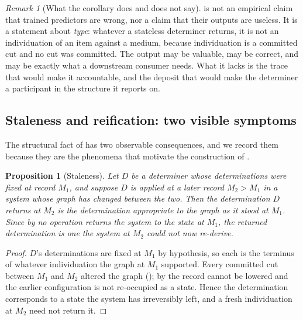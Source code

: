 \documentclass[11pt,twocolumn,a4paper]{article}
\theoremstyle{dirthm}
\newtheorem{proposition}[theorem]{Proposition}
\theoremstyle{definition}
\theoremstyle{remark}
\newtheorem{remark}[theorem]{Remark}
\newcommand{\rec}{M}
\begin{document}
\begin{remark}[What the corollary does and does not say]
\label{rem:corollary-honest}
 is not an empirical claim that trained
predictors are wrong, nor a claim that their outputs are useless. It is a
statement about \emph{type}: whatever a stateless determiner returns, it is
not an individuation of an item against a medium, because individuation is a
committed cut and no cut was committed. The output may be valuable, may be
correct, and may be exactly what a downstream consumer needs. What it lacks
is the trace that would make it accountable, and the deposit that would make
the determiner a participant in the structure it reports on.
\end{remark}

\subsection{Staleness and reification: two visible symptoms}
\label{sec:reification}

The structural fact of  has two observable
consequences, and we record them because they are the phenomena that
motivate the construction of .

\begin{proposition}[Staleness]
\label{prop:staleness}
Let $D$ be a determiner whose determinations were fixed at record $\rec_1$,
and suppose $D$ is applied at a later record $\rec_2>\rec_1$ in a system whose
graph has changed between the two. Then the determination $D$ returns at
$\rec_2$ is the determination appropriate to the graph as it stood at
$\rec_1$. Since by  no operation returns the system to the
state at $\rec_1$, the returned determination is one the system at $\rec_2$
could not now re-derive.
\end{proposition}

\begin{proof}
$D$'s determinations are fixed at $\rec_1$ by hypothesis, so each is the
terminus of whatever individuation the graph at $\rec_1$ supported. Every
committed cut between $\rec_1$ and $\rec_2$ altered the graph
(); by  the record cannot be lowered
and the earlier configuration is not re-occupied as a state. Hence the
determination corresponds to a state the system has irreversibly left, and a
fresh individuation at $\rec_2$ need not return it.
\end{proof}
\end{document}
